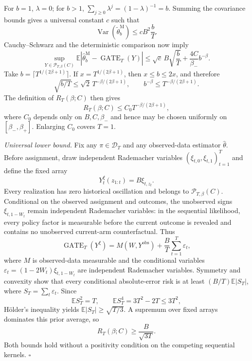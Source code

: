 For \(b=1\), \(\lambda=0\); for \(b>1\), \(\sum_{j\ge0}\lambda^j=(1-\lambda)^{-1}=b\). Summing the covariance bounds gives a universal constant \(c\) such that
\[
\operatorname{Var}\!\left(\widetilde\theta_b^{\mathrm M}\right)
\le cB^2\frac bT.
\]
Cauchy--Schwarz and the deterministic comparison now imply
\[
\sup_{Y\in\mathcal P_{T,\beta}(C)}
\mathbb E\left|\widehat\theta_b^{\mathrm M}-\operatorname{GATE}_T(Y)\right|
\le \sqrt c\,B\sqrt{\frac bT}+\frac{4C}{\beta_-}b^{-\beta}.
\]
Take \(b=\lceil T^{1/(2\beta+1)}\rceil\). If \(x=T^{1/(2\beta+1)}\), then \(x\le b\le2x\), and therefore
\[
\sqrt{b/T}\le\sqrt2\,T^{-\beta/(2\beta+1)},
\qquad
b^{-\beta}\le T^{-\beta/(2\beta+1)}.
\]
The definition of \(R_T(\beta;C)\) then gives
\[
R_T(\beta;C)\le C_0T^{-\beta/(2\beta+1)},
\]
where \(C_0\) depends only on \(B,C,\beta_-\) and hence may be chosen uniformly on \([\beta_-,\beta_+]\). Enlarging \(C_0\) covers \(T=1\).

\emph{Universal lower bound.} Fix any \(\pi\in\mathcal D_T\) and any observed-data estimator \(\widehat\theta\). Before assignment, draw independent Rademacher variables \((\xi_{t,0},\xi_{t,1})_{t=1}^T\) and define the fixed array
\[
Y_t^\xi(z_{1:t})=B\xi_{t,z_t}.
\]
Every realization has zero historical oscillation and belongs to \(\mathcal P_{T,\beta}(C)\). Conditional on the observed assignment and outcomes, the unobserved signs \(\xi_{t,1-W_t}\) remain independent Rademacher variables: in the sequential likelihood, every policy factor is measurable before the current outcome is revealed and contains no unobserved current-arm counterfactual. Thus
\[
\operatorname{GATE}_T(Y^\xi)
=M(W,Y^{\mathrm{obs}})+\frac BT\sum_{t=1}^T\varepsilon_t,
\]
where \(M\) is observed-data measurable and the conditional variables \(\varepsilon_t=(1-2W_t)\xi_{t,1-W_t}\) are independent Rademacher variables. Symmetry and convexity show that every conditional absolute-error risk is at least \((B/T)\mathbb E|S_T|\), where \(S_T=\sum_t\varepsilon_t\). Since
\[
\mathbb ES_T^2=T,
\qquad
\mathbb ES_T^4=3T^2-2T\le3T^2,
\]
Hölder's inequality yields \(\mathbb E|S_T|\ge\sqrt{T/3}\). A supremum over fixed arrays dominates this prior average, so
\[
R_T(\beta;C)\ge\frac{B}{\sqrt{3T}}.
\]
Both bounds hold without a positivity condition on the competing sequential kernels. \(\square\)